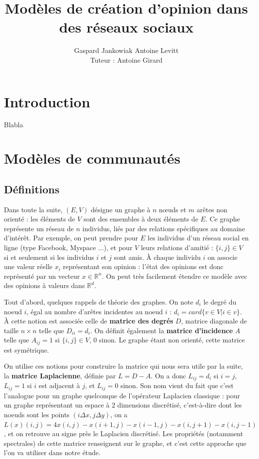 \documentclass[12pt]{article}
\newcommand{\R}{\mathbb{R}}
\begin{document}
\author{Gaspard Jankowiak \quad Antoine Levitt\\ Tuteur : Antoine Girard}
\title{Modèles de création d'opinion dans des réseaux sociaux}
\maketitle
{}
\tableofcontents
\newpage


\section{Introduction}
Blabla


\section{Modèles de communautés}
\subsection{Définitions}
Dans toute la suite, $(E, V)$ désigne un graphe à $n$ n\oe uds et $m$
arêtes non orienté : les éléments de $V$ sont des ensembles à deux
éléments de $E$. Ce graphe représente un réseau de $n$ individus, liés
par des relations spécifiques au domaine d'intérêt. Par exemple, on
peut prendre pour $E$ les individus d'un réseau social en ligne (type
Facebook, Myspace ...), et pour $V$ leurs relations d'amitié : $\{i,
j\} \in V$ si et seulement si les individus $i$ et $j$ sont amis. À chaque individu
$i$ on associe une valeur réelle $x_i$ représentant son opinion :
l'état des opinions est donc représenté par un vecteur $x \in
\R^n$. On peut très facilement étendre ce modèle avec des opinions à valeurs
dans $\R^d$.

Tout d'abord, quelques rappels de théorie des graphes. On note $d_i$
le degré du noeud $i$, égal au nombre d'arêtes incidentes au noeud
$i$ : $d_i = card \{v \in V | i \in v\}$. À cette notion est
associée celle de {\bf matrice des degrés} $D$, matrice diagonale
de taille $n \times n$ telle que $D_{i i} = d_i$. On définit
également la {\bf matrice d'incidence} $A$ telle que $A_{i j} = 1$
si $\{i, j\} \in V$, $0$ sinon. Le graphe étant non orienté, cette
matrice est symétrique.

On utilise ces notions pour construire la matrice qui nous sera
utile par la suite, la {\bf matrice Laplacienne}, définie par $L
= D - A$. On a donc $L_{i j} = d_i$ si $i = j$, $L_{i j} = 1$ si
$i$ est adjacent à $j$, et $L_{i j} = 0$ sinon. Son nom vient du
fait que c'est l'analogue pour un graphe quelconque de
l'opérateur Laplacien classique : pour un graphe représentant un
espace à $2$ dimensions discrétisé, c'est-à-dire dont les noeuds
sont les points $(i \Delta x, j \Delta y)$, on a $L(x) (i, j) =
4 x(i, j) - x(i+1, j) - x(i-1, j) - x(i, j+1) - x(i, j-1)$, et
on retrouve au signe près le Laplacien discrétisé. Les
propriétés (notamment spectrales) de cette matrice renseignent
sur le graphe, et c'est cette approche que l'on va utiliser dans
notre étude.
\end{document}
